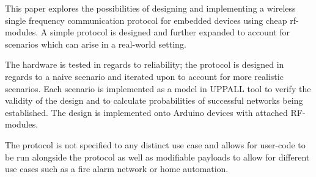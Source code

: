 This paper explores the possibilities of designing and implementing a wireless single frequency communication protocol for embedded devices using cheap \acrshort{rf}-modules.
A simple protocol is designed and further expanded to account for scenarios which can arise in a real-world setting.

\medskip
The hardware is tested in regards to reliability; the protocol is designed in regards to a naive scenario and iterated upon to account for more realistic scenarios.
Each scenario is implemented as a model in UPPALL tool to verify the validity of the design and to calculate probabilities of successful networks being established.
The design is implemented onto Arduino devices with attached RF-modules.

\medskip
The protocol is not specified to any distinct use case and allows for user-code to be run alongside the protocol as well as modifiable payloads to allow for different use cases such as a fire alarm network or home automation. 